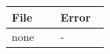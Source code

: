 \begin{tabular}{p{0.42\linewidth}p{0.42\linewidth}}
\toprule
\textbf{File} & \textbf{Error} \\
\midrule
none & - \\
\bottomrule
\end{tabular}
